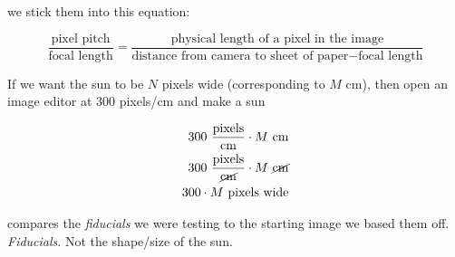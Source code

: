 \documentclass[10pt]{scrartcl}
\begin{document}
we stick them into this equation:

\begin{equation}
    \frac{\textrm{pixel pitch}}{\textrm{focal length}} = \frac{\textrm{physical length of a pixel in the image}}{\textrm{distance from camera to sheet of paper}-\textrm{focal length}}
\end{equation}

If we want the sun to be $N$ pixels wide (corresponding to $M$ cm), then open an image editor at 300 pixels/cm and make a sun 

\begin{align}
    300 ~\frac{\textrm{pixels}}{\textrm{cm}} \cdot M ~\textrm{cm}\\
    300 ~\frac{\textrm{pixels}}{\cancel{\textrm{cm}}} \cdot M ~\cancel{\textrm{cm}}\\
    300 \cdot M~\textrm{pixels wide}
\end{align}

 compares the \emph{fiducials} we were testing to the starting image we based them off. \emph{Fiducials}. Not the shape/size of the sun.

\begin{figure}[!ht]
\end{figure}
\end{document}
